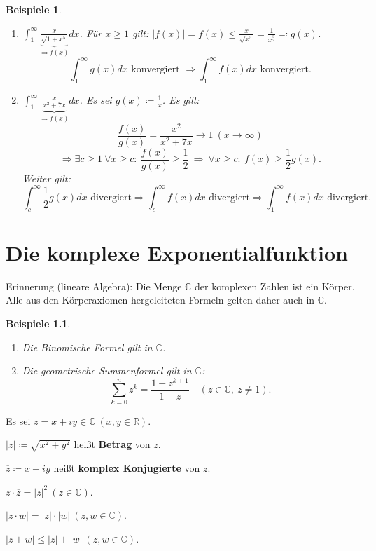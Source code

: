\documentclass[12pt]{extreport} %
\newcommand{\C}{\mathbb{C}}
\newcommand{\R}{\mathbb{R}}
\theoremstyle{named}
\theoremstyle{itshape}
\theoremstyle{normal}
\newtheorem*{beispiele}{Beispiele}
\begin{document}
{\begin{beispiele} ~\
	\begin{enumerate}
		\item $\int_{1}^{\infty} \underbrace{\frac{x}{\sqrt{1 + x^{5}}}}_{\eqqcolon f(x)} dx$.  Für $x\ge 1$ gilt: 
		      $|f(x)| = f(x) \leq \frac{x}{\sqrt{x^{5}}} = \frac{1}{x^{\frac{3}{2}}} \eqqcolon g(x)$. 
		      $$ \int_{1}^{\infty} g(x) dx \text{ konvergiert } \Rightarrow \int_{1}^{\infty} f(x) dx \text{ konvergiert}. $$
		\item $\int_{1}^{\infty} \underbrace{\frac{x}{x^{2} + 7x}}_{\eqqcolon f(x)} dx$. Es sei $g(x) \coloneqq \frac{1}{x}$. Es gilt: 
		      $$\frac{f(x)}{g(x)} = \frac{x^{2}}{x^{2} + 7x} \rightarrow 1 ~(x \rightarrow \infty)$$
			$$ \Rightarrow \exists c \geq 1~ \forall  x \geq c: ~ \frac{f(x)}{g(x)} \geq \frac{1}{2} 
			~ \Rightarrow ~ \forall x \geq c: ~ f(x) \geq \frac{1}{2} g(x). $$
			Weiter gilt:
			$$
			\int_{c}^{\infty} \frac{1}{2}g(x) dx \text{ divergiert} \Rightarrow \int_{c}^{\infty} f(x) dx \text{ divergiert}
			\Rightarrow \int_{1}^{\infty} f(x) dx \text{ divergiert}.
			$$
	\end{enumerate}
\end{beispiele}

\newpage

\chapter{Die komplexe Exponentialfunktion}

Erinnerung (lineare Algebra): Die Menge $\C$ der komplexen Zahlen ist ein Körper. Alle aus den Körperaxiomen hergeleiteten Formeln 
gelten daher auch in $\C$. 

\begin{beispiele} ~\
\begin{enumerate}
 \item Die Binomische Formel gilt in $\C$.
 \item Die geometrische Summenformel gilt in $\C$:
 $$
 \sum_{k=0}^{n} z^{k} = \frac{1 - z^{k+1}}{1 - z} \quad (z \in \C, ~ z \neq 1).
 $$
\end{enumerate}
\end{beispiele}



Es sei $z = x + iy \in \C ~(x, y \in \R)$. 
\begin{description}  \addtolength{\itemindent}{0.4cm}
	\item $|z| \coloneqq \sqrt{x^{2} + y^{2}}$ hei{\ss}t \textbf{Betrag} von $z$.
	\item $\overline{z} \coloneqq x - iy$ hei{\ss}t \textbf{komplex Konjugierte} von $z$.
	\item $z \cdot \overline{z} = |z|^{2} ~(z \in \C)$.
	\item $|z \cdot w| = |z| \cdot |w| ~(z, w \in \C)$.
	\item $|z+ w| \le |z|+|w| ~(z, w \in \C)$.
\end{description}



}
\end{document}
